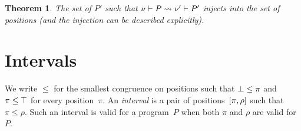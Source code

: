 \documentclass[a4paper]{article}
\theoremstyle{theorem}
\newtheorem{theorem}{Theorem}
\newtheorem{lemma}[theorem]{Lemma}
\theoremstyle{remark}
\newtheorem{remark}[theorem]{Remark}
\begin{document}




\begin{theorem}
  The set of $P'$ such that $\nu\vdash P\rightsquigarrow\nu'\vdash P'$ injects into the
  set of positions (and the injection can be described explicitly).
\end{theorem}

\section{Intervals}
We write $\leq$ for the smallest congruence on positions such that
$\bot\leq\pi$ and $\pi\leq\top$ for every position~$\pi$. An \emph{interval}
is a pair of positions~$[\pi,\rho]$ such that $\pi\leq\rho$. Such an interval
is valid for a program~$P$ when both $\pi$ and $\rho$ are valid for~$P$.
\end{document}
